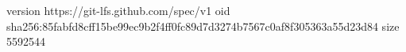 version https://git-lfs.github.com/spec/v1
oid sha256:85fabfd8cff15be99ec9b2f4ff0fc89d7d3274b7567c0af8f305363a55d23d84
size 5592544
